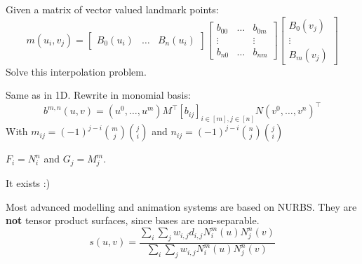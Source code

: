 \begin{definition}
  Given a matrix of vector valued landmark points:
  \[m(u_i, v_j) = \begin{bmatrix}
    B_0(u_i) & \ldots & B_n(u_i)
  \end{bmatrix} \begin{bmatrix}
    b_{00} & \ldots & b_{0m} \\ \vdots && \vdots \\ b_{n0} & \ldots & b_{nm}
  \end{bmatrix} \begin{bmatrix}
    B_0(v_j) \\ \vdots \\ B_m(v_j)
  \end{bmatrix}\]
  Solve this interpolation problem.
\end{definition}

\begin{definition}
  Same as in 1D. Rewrite in monomial basis:
  \[b^{m, n}(u, v) = (u^0, \ldots, u^m)M^\top[b_{ij}]_{i\in[m], j\in[n]}N (v^0, \ldots, v^n)^\top\]
  With \(m_{ij} = (-1)^{j - i} \binom{m}{j}\binom{j}{i}\) and \(n_{ij} = (-1)^{j - i} \binom{n}{j}\binom{j}{i}\)
\end{definition}

\begin{definition}
  \(F_i = N_i^n\) and \(G_j = M_j^m\).
\end{definition}

\begin{algorithm}
  It exists :)
\end{algorithm}

\begin{definition}
  Most advanced modelling and animation systems are based on NURBS. They are \textbf{not} tensor product surfaces, since bases are non-separable.
  \[s(u,v) = \frac{\sum_i \sum_j w_{i, j} d_{i, j}N_i^m(u)N_j^n(v)}{\sum_i \sum_j w_{i, j}N_i^m(u)N_j^n(v)}\]
\end{definition}
